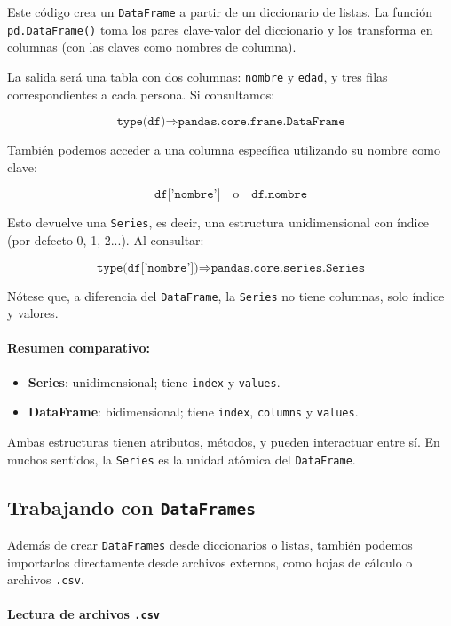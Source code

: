\documentclass{article}
\theoremstyle{nonumberplain}
\begin{document}
Este código crea un \texttt{DataFrame} a partir de un diccionario de listas. La función \texttt{pd.DataFrame()} toma los pares clave-valor del diccionario y los transforma en columnas (con las claves como nombres de columna).

La salida será una tabla con dos columnas: \texttt{nombre} y \texttt{edad}, y tres filas correspondientes a cada persona. Si consultamos:

\[
\texttt{type(df)} \Rightarrow \texttt{pandas.core.frame.DataFrame}
\]

También podemos acceder a una columna específica utilizando su nombre como clave:

\[
\texttt{df['nombre']} \quad \text{o} \quad \texttt{df.nombre}
\]

Esto devuelve una \texttt{Series}, es decir, una estructura unidimensional con índice (por defecto 0, 1, 2...). Al consultar:

\[
\texttt{type(df['nombre'])} \Rightarrow \texttt{pandas.core.series.Series}
\]

Nótese que, a diferencia del \texttt{DataFrame}, la \texttt{Series} no tiene columnas, solo índice y valores.

\paragraph{Resumen comparativo:}

\begin{itemize}
    \item \textbf{Series}: unidimensional; tiene \texttt{index} y \texttt{values}.
    \item \textbf{DataFrame}: bidimensional; tiene \texttt{index}, \texttt{columns} y \texttt{values}.
\end{itemize}

Ambas estructuras tienen atributos, métodos, y pueden interactuar entre sí. En muchos sentidos, la \texttt{Series} es la unidad atómica del \texttt{DataFrame}.

\subsection*{Trabajando con \texttt{DataFrames}}

Además de crear \texttt{DataFrames} desde diccionarios o listas, también podemos importarlos directamente desde archivos externos, como hojas de cálculo o archivos \texttt{.csv}.

\paragraph{Lectura de archivos \texttt{.csv}}
\end{document}
